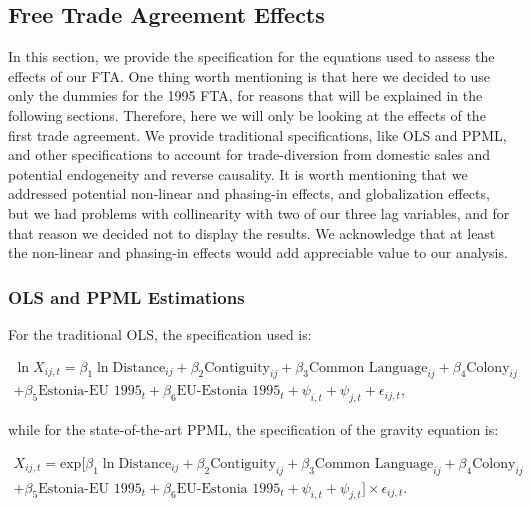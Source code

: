 \documentclass[a4paper,10pt]{article}
\begin{document}
\subsection{Free Trade Agreement Effects} \label{fta}

In this section, we provide the specification for the equations used to assess the effects of our FTA. One thing worth mentioning is that here we decided to use only the dummies for the 1995 FTA, for reasons that will be explained in the following sections. Therefore, here we will only be looking at the effects of the first trade agreement. We provide traditional specifications, like OLS and PPML, and other specifications to account for trade-diversion from domestic sales and potential endogeneity and reverse causality. It is worth mentioning that we addressed potential non-linear and phasing-in effects, and globalization effects, but we had problems with collinearity with two of our three lag variables, and for that reason we decided not to display the results. We acknowledge that at least the non-linear and phasing-in effects would add appreciable value to our analysis.

\subsubsection{OLS and PPML Estimations} \label{fta_ols_ppml}

For the traditional OLS, the specification used is:

\vspace{-1cm}

\begin{multline*}
	\ln X_{ij,t}  = \beta_{1} \ln \text{Distance}_{ij} + \beta_{2} \text{Contiguity}_{ij} + \beta_{3} \text{Common Language}_{ij} + \beta_{4} \text{Colony}_{ij} \\
	+ \beta_{5} \text{Estonia-EU 1995}_{t} + \beta_{6} \text{EU-Estonia 1995}_{t} + \psi_{i,t} + \psi_{j,t} + \epsilon_{ij,t},
\end{multline*}

\noindent while for the state-of-the-art PPML, the specification of the gravity equation is:

\vspace{-1cm}

\begin{multline*}
	X_{ij,t} = \text{exp} [\beta_{1} \ln \text{Distance}_{ij} + \beta_{2} \text{Contiguity}_{ij} + \beta_{3} \text{Common Language}_{ij} + \beta_{4} \text{Colony}_{ij} \\
	+ \beta_{5} \text{Estonia-EU 1995}_{t} + \beta_{6} \text{EU-Estonia 1995}_{t} + \psi_{i,t} + \psi_{j,t}] \times \epsilon_{ij,t}.
\end{multline*}
\end{document}
